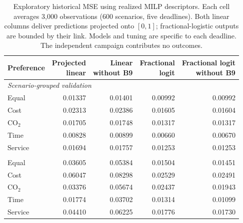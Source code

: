 \begin{table}[htbp]\centering\small
\begin{tabular}{lrrrr}\toprule
Preference & \shortstack{Projected\\linear} & \shortstack{Linear\\without B9} & \shortstack{Fractional\\logit} & \shortstack{Fractional logit\\without B9}\\\midrule
\multicolumn{5}{l}{\textit{Scenario-grouped validation}}\\
Equal & 0.01337 & 0.01401 & 0.00992 & 0.00992\\
Cost & 0.02313 & 0.02386 & 0.01605 & 0.01604\\
CO$_2$ & 0.01705 & 0.01748 & 0.01317 & 0.01317\\
Time & 0.00828 & 0.00899 & 0.00660 & 0.00670\\
Service & 0.01694 & 0.01757 & 0.01253 & 0.01253\\
\addlinespace
\multicolumn{5}{l}{\textit{Family-held-out validation}}\\
Equal & 0.03605 & 0.05384 & 0.01504 & 0.01451\\
Cost & 0.06047 & 0.08298 & 0.02529 & 0.02491\\
CO$_2$ & 0.03376 & 0.05674 & 0.02437 & 0.01943\\
Time & 0.01774 & 0.03702 & 0.01314 & 0.01099\\
Service & 0.04410 & 0.06225 & 0.01776 & 0.01730\\
\bottomrule
\end{tabular}
\caption{Exploratory historical MSE using realized MILP descriptors. Each cell averages 3,000 observations (600 scenarios, five deadlines). Both linear columns deliver predictions projected onto $[0,1]$; fractional-logistic outputs are bounded by their link. Models and tuning are specific to each deadline. The independent campaign contributes no outcomes.}\label{tab:bounded_milp}
\end{table}
